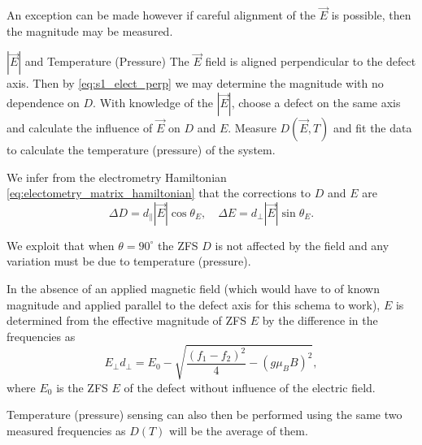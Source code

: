 An exception can be made however if careful alignment of the $\vec{E}$ is possible, then the magnitude may be measured. 

\begin{proposal}{$|\vec{E}|$ and Temperature (Pressure)}
    The $\vec{E}$ field is aligned perpendicular to the defect axis. Then by \eqref{eq:s1_elect_perp} we may determine the magnitude with no dependence on $D$. With knowledge of the $|\vec{E}|$, choose a defect on the same axis and calculate the influence of $\vec{E}$ on $D$ and $E$. Measure $D(\vec{E}, T)$ and fit the data to calculate the temperature (pressure) of the system. 
\end{proposal}

We infer from the electrometry Hamiltonian \eqref{eq:electometry_matrix_hamiltonian} that the corrections to $D$ and $E$ are 
\begin{equation}
    \Delta D = d_\parallel |\vec{E}| \cos\theta_E, \quad \Delta E = d_\perp |\vec{E}| \sin \theta_E.
    \label{eq:}
\end{equation}

We exploit that when $\theta = 90^\circ$ the ZFS $D$ is not affected by the field and any variation must be due to temperature (pressure). 

In the absence of an applied magnetic field (which would have to of known magnitude and applied parallel to the defect axis for this schema to work), $E$ is determined from the effective magnitude of ZFS $E$ by the difference in the frequencies as
\begin{equation}
    E_\perp d_\perp = E_0 - \sqrt{\frac{(f_1 - f_2)^2}{4} - (g \mu_B B)^2}, 
    \label{eq:multi-E+T}
\end{equation}
where $E_0$ is the ZFS $E$ of the defect without influence of the electric field. 

Temperature (pressure) sensing can also then be performed using the same two measured frequencies as $D(T)$ will be the average of them. 

